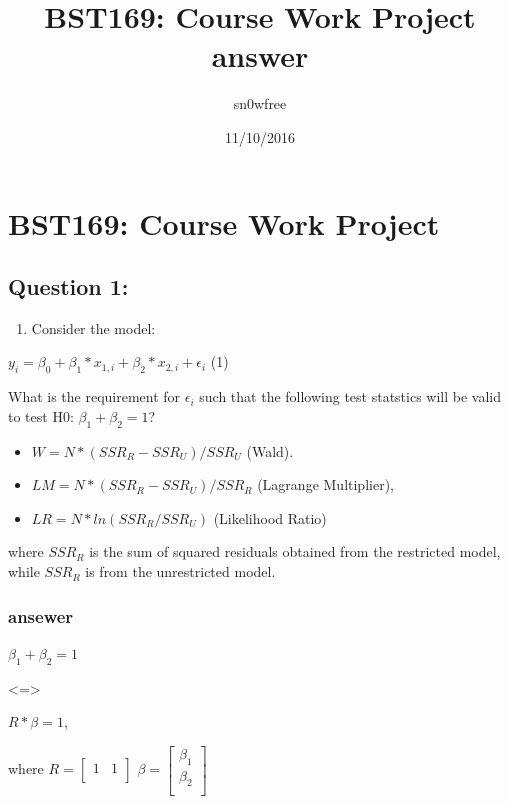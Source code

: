 \documentclass[]{article}
\title{BST169: Course Work Project answer}
\author{sn0wfree}
\date{11/10/2016}
\providecommand{\tightlist}{%
  \setlength{\itemsep}{0pt}\setlength{\parskip}{0pt}}
\begin{document}
\maketitle

{
\setcounter{tocdepth}{2}
\tableofcontents
}
\section{BST169: Course Work Project}\label{bst169-course-work-project}

\subsection{Question 1:}\label{question-1}

\begin{enumerate}
\def\labelenumi{\arabic{enumi}.}
\tightlist
\item
  Consider the model:
\end{enumerate}

\centerline{$y_i = \beta_0 +\beta_1*x_{1,i} +\beta_2*x_{2,i} +\epsilon_i$   (1)}

What is the requirement for \(\epsilon_i\) such that the following test
statstics will be valid to test H0: \(\beta_1 + \beta_2 =1\)?

\begin{itemize}
\tightlist
\item
  \(W=N*(SSR_{R} - SSR_{U})/SSR_{U}\) (Wald).
\item
  \(LM = N*(SSR_{R} - SSR_{U})/SSR_{R}\) (Lagrange Multiplier),
\item
  \(LR = N* ln(SSR_{R}/SSR_{U})\) (Likelihood Ratio)
\end{itemize}

where \(SSR_{R}\) is the sum of squared residuals obtained from the
restricted model, while \(SSR_{R}\) is from the unrestricted model.

\subsubsection{ansewer}\label{ansewer}

\centerline{$\beta_1 + \beta_2 =1$}

\textless{}=\textgreater{}

\centerline{$R*\beta =1$,}

where \(R=\begin{bmatrix} 1 & 1 \\ \end{bmatrix}\)
\(\beta=\begin{bmatrix} \beta_1 \\ \beta_2 \\ \end{bmatrix}\)
\end{document}
